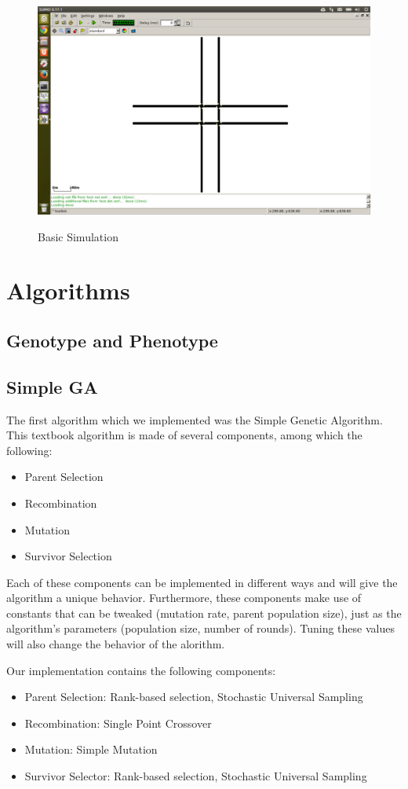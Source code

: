 \documentclass{article} %
\begin{document}
\begin{figure}
\caption{Basic Simulation}
\includegraphics[width=\textwidth]{images/simulator/gridoptimum.png}
\label{fig:gridoptimum}
\end{figure}

\section{Algorithms}
\subsection{Genotype and Phenotype}


\subsection{Simple GA}
The first algorithm which we implemented was the Simple Genetic Algorithm. This textbook algorithm is made of several components, among which the following:
\begin{itemize}
 \item Parent Selection
 \item Recombination
 \item Mutation
 \item Survivor Selection
\end{itemize}
Each of these components can be implemented in different ways and will give the algorithm a unique behavior. Furthermore, these components make use of constants that can be tweaked (mutation rate, parent population size), just as the algorithm's parameters (population size, number of rounds). Tuning these values will also change the behavior of the alorithm.

Our implementation contains the following components:
\begin{itemize}
 \item Parent Selection: Rank-based selection, Stochastic Universal Sampling
 \item Recombination: Single Point Crossover
 \item Mutation: Simple Mutation
 \item Survivor Selector: Rank-based selection, Stochastic Universal Sampling
\end{itemize}
\end{document}
